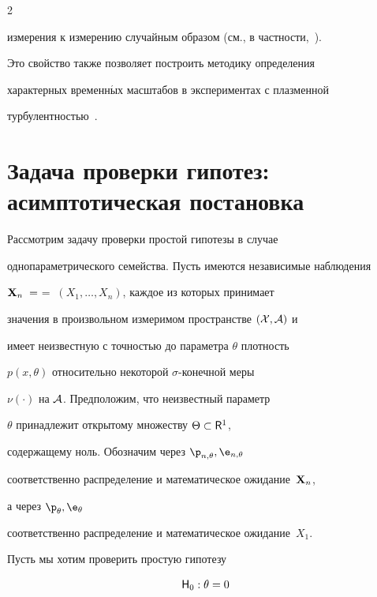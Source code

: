 \begin{multicols}{2}
\begin{enumerate}[1.]
измерения к измерению случайным образом (см., в частности,~\cite{52be, 17be}).


Это свойство также позволяет построить методику определения


характерных временн$\acute{\mbox{ы}}$х масштабов в экспериментах с плазменной


турбулентностью~\cite{11be}.


\end{enumerate}





\section{Задача проверки гипотез: асимптотическая постановка}





Рассмотрим задачу проверки простой гипотезы в случае


однопараметрического семейства. Пусть имеются независимые наблюдения


${\bf X}_n\;=$\linebreak $=\;(X_1,\ldots,X_n)$, каждое из которых принимает


значения в произвольном измеримом пространстве $(\cal{X},\cal{A})$ и


имеет неизвестную с точностью до параметра $\theta$ плотность


$p(x,\theta)$ относительно некоторой $\sigma$-конечной меры


$\nu(\cdot)$ на $\cal{A}$. Предположим, что неизвестный параметр


$\theta$ принадлежит открытому множеству $\Theta\subset{\sf R}^1$,


содержащему ноль. Обозначим через ${\p}_{n,\theta}, {\e}_{n,\theta}$


соответственно распределение и математическое ожидание~${\bf X}_n$, 


а через ${\p}_{\theta}, {\e}_{\theta}$


соответственно распределение и математическое ожидание~$X_1$.





Пусть мы хотим проверить простую гипотезу


\begin{equation}


 {\sf H}_0:\theta=0


\label{6.1b}



\end{equation}
\end{multicols}
